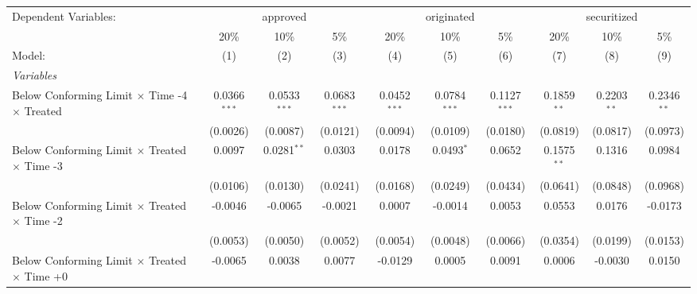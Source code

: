 \begingroup
\centering
\begin{tabular}{lccccccccc}
   \tabularnewline \midrule \midrule
   Dependent Variables: & \multicolumn{3}{c}{approved} & \multicolumn{3}{c}{originated} & \multicolumn{3}{c}{securitized}\\
                                                              & 20\%           & 10\%           & 5\%            & 20\%           & 10\%           & 5\%            & 20\%           & 10\%           & 5\% \\    
   Model:                                                     & (1)            & (2)            & (3)            & (4)            & (5)            & (6)            & (7)            & (8)            & (9)\\  
   \midrule
   \emph{Variables}\\
   Below Conforming Limit $\times$ Time -4 $\times$ Treated   & 0.0366$^{***}$ & 0.0533$^{***}$ & 0.0683$^{***}$ & 0.0452$^{***}$ & 0.0784$^{***}$ & 0.1127$^{***}$ & 0.1859$^{**}$  & 0.2203$^{**}$  & 0.2346$^{**}$\\   
                                                              & (0.0026)       & (0.0087)       & (0.0121)       & (0.0094)       & (0.0109)       & (0.0180)       & (0.0819)       & (0.0817)       & (0.0973)\\   
   Below Conforming Limit $\times$ Treated $\times$ Time -3   & 0.0097         & 0.0281$^{**}$  & 0.0303         & 0.0178         & 0.0493$^{*}$   & 0.0652         & 0.1575$^{**}$  & 0.1316         & 0.0984\\   
                                                              & (0.0106)       & (0.0130)       & (0.0241)       & (0.0168)       & (0.0249)       & (0.0434)       & (0.0641)       & (0.0848)       & (0.0968)\\   
   Below Conforming Limit $\times$ Treated $\times$ Time -2   & -0.0046        & -0.0065        & -0.0021        & 0.0007         & -0.0014        & 0.0053         & 0.0553         & 0.0176         & -0.0173\\   
                                                              & (0.0053)       & (0.0050)       & (0.0052)       & (0.0054)       & (0.0048)       & (0.0066)       & (0.0354)       & (0.0199)       & (0.0153)\\   
   Below Conforming Limit $\times$ Treated $\times$ Time +0   & -0.0065        & 0.0038         & 0.0077         & -0.0129        & 0.0005         & 0.0091         & 0.0006         & -0.0030        & 0.0150\\   

\end{tabular}
